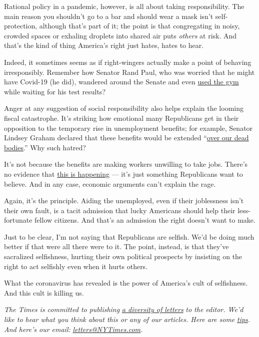 Rational policy in a pandemic, however, is all about taking
responsibility. The main reason you shouldn't go to a bar and should
wear a mask isn't self-protection, although that's part of it; the point
is that congregating in noisy, crowded spaces or exhaling droplets into
shared air puts \emph{others} at risk. And that's the kind of thing
America's right just hates, hates to hear.

Indeed, it sometimes seems as if right-wingers actually make a point of
behaving irresponsibly. Remember how Senator Rand Paul, who was worried
that he might have Covid-19 (he did), wandered around the Senate and
even
\href{https://www.theatlantic.com/politics/archive/2020/03/rand-paul-coronavirus-test-reckless/608593/}{used
the gym} while waiting for his test results?

Anger at any suggestion of social responsibility also helps explain the
looming fiscal catastrophe. It's striking how emotional many Republicans
get in their opposition to the temporary rise in unemployment benefits;
for example, Senator Lindsey Graham declared that these benefits would
be extended
``\href{https://www.businessinsider.com/lindsey-graham-congress-coronavirus-unemployment-benefit-over-our-dead-bodies-2020-4}{over
our dead bodies}.'' Why such hatred?

It's not because the benefits are making workers unwilling to take jobs.
There's no evidence that
\href{https://twitter.com/ernietedeschi/status/1285687440058064903}{this
is happening} --- it's just something Republicans want to believe. And
in any case, economic arguments can't explain the rage.

Again, it's the principle. Aiding the unemployed, even if their
joblessness isn't their own fault, is a tacit admission that lucky
Americans should help their less-fortunate fellow citizens. And that's
an admission the right doesn't want to make.

Just to be clear, I'm not saying that Republicans are selfish. We'd be
doing much better if that were all there were to it. The point, instead,
is that they've sacralized selfishness, hurting their own political
prospects by insisting on the right to act selfishly even when it hurts
others.

What the coronavirus has revealed is the power of America's cult of
selfishness. And this cult is killing us.

\emph{The Times is committed to publishing}
\href{https://www.nytimes3xbfgragh.onion/2019/01/31/opinion/letters/letters-to-editor-new-york-times-women.html}{\emph{a
diversity of letters}} \emph{to the editor. We'd like to hear what you
think about this or any of our articles. Here are some}
\href{https://help.nytimes3xbfgragh.onion/hc/en-us/articles/115014925288-How-to-submit-a-letter-to-the-editor}{\emph{tips}}\emph{.
And here's our email:}
\href{mailto:letters@NYTimes.com}{\emph{letters@NYTimes.com}}\emph{.}

